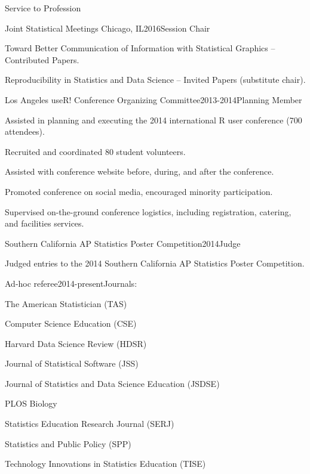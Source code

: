 \documentclass{resume} %
\begin{document}
\begin{rSection}{Service to Profession}
\begin{rSubsection}{Joint Statistical Meetings}{ Chicago, IL}{2016}{Session Chair}
\item Toward Better Communication of Information with Statistical Graphics -- Contributed Papers.
\item Reproducibility in Statistics and Data Science -- Invited Papers (substitute chair).
\end{rSubsection}

\begin{rSubsection}{Los Angeles useR! Conference Organizing Committee}{}{2013-2014}{Planning Member}
\item Assisted in planning and executing the 2014 international R user conference (700 attendees).
\item Recruited and coordinated 80 student volunteers.
\item Assisted with conference website before, during, and after the conference.
\item Promoted conference on social media, encouraged minority participation.
\item Supervised on-the-ground conference logistics, including registration, catering, and facilities services. 
\end{rSubsection}

\begin{rSubsection}{Southern California AP Statistics Poster Competition}{}{2014}{Judge}
\item Judged entries to the 2014 Southern California AP Statistics Poster Competition.
\end{rSubsection}


\begin{rSubsection}{Ad-hoc referee}{}{2014-present}{Journals:}
\item The American Statistician (TAS)
\item Computer Science Education (CSE)
\item Harvard Data Science Review (HDSR)
\item Journal of Statistical Software (JSS)
\item Journal of Statistics and Data Science Education (JSDSE)
\item PLOS Biology 
\item Statistics Education Research Journal (SERJ)
\item Statistics and Public Policy (SPP)
\item Technology Innovations in Statistics Education (TISE)
\end{rSubsection}


\end{rSection}
\end{document}
